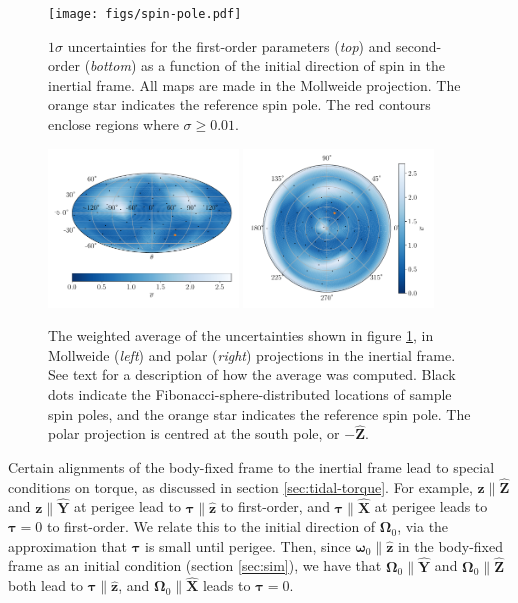\documentclass[fleqn,usenatbib]{mnras}
\newcommand{\unit}[1]{\bm{\hat{#1}}}
\begin{document}
\begin{figure}
  \centering
  \texttt{[image: figs/spin-pole.pdf]}
  \caption{$1\sigma$ uncertainties for the first-order parameters (\textit{top}) and second-order (\textit{bottom}) as a function of the initial direction of spin in the inertial frame. All maps are made in the Mollweide projection. The orange star indicates the reference spin pole. The red contours enclose regions where $\sigma \geq 0.01$.}
  \label{fig:scan-spin}
\end{figure}

\begin{figure}
  \centering
  \includegraphics[width=0.45\textwidth]{figs/spin-pole-avg-mollweide.pdf}
  \includegraphics[width=0.45\textwidth]{figs/spin-pole-avg-polar.pdf}
  \caption{The weighted average of the uncertainties shown in figure \ref{fig:scan-spin}, in Mollweide (\textit{left}) and polar (\textit{right}) projections in the inertial frame. See text for a description of how the average was computed. Black dots indicate the Fibonacci-sphere-distributed locations of sample spin poles, and the orange star indicates the reference spin pole. The polar projection is centred at the south pole, or $-\unit Z$.}
  \label{fig:scan-spin-avg}
\end{figure}

Certain alignments of the body-fixed frame to the inertial frame lead to special conditions on torque, as discussed in section \ref{sec:tidal-torque}. For example, $\bm z \parallel \unit Z$ and $\bm z \parallel \unit Y$ at perigee lead to $\bm \tau \parallel \unit z$ to first-order, and $\bm \tau \parallel \unit X$ at perigee leads to $\bm \tau = 0$ to first-order. We relate this to the initial direction of $\bm \Omega_0$, via the approximation that $\bm \tau$ is small until perigee. Then, since $\bm \omega_0 \parallel \unit z$ in the body-fixed frame as an initial condition (section \ref{sec:sim}), we have that $\bm \Omega_0 \parallel \unit Y$ and $\bm \Omega_0 \parallel \unit Z$ both lead to $\bm \tau \parallel \unit z$, and $\bm \Omega_0 \parallel \unit X$ leads to $\bm \tau = 0$.
\end{document}
